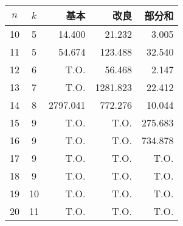  \centering 
 \begin{tabular}{c|c|r|r|r} %
  $n$ & $k$ & 基本 & 改良 & 部分和 \\ \hline
  10 & 5 & 14.400 & 21.232 & \alert{3.005} \\
  11 & 5 & 54.674 & 123.488 & \alert{32.540} \\
  12 & 6 & T.O. & 56.468 & \alert{2.147} \\
  13 & 7 & T.O. & 1281.823 & \alert{22.412} \\  
  14 & 8 & 2797.041 & 772.276 & \alert{10.044} \\   
  15 & 9 & T.O. & T.O. & \alert{275.683} \\  
  16 & 9 & T.O. & T.O. & \alert{734.878} \\
  17 & 9 & T.O. & T.O. & T.O. \\
  18 & 9 & T.O. & T.O. & T.O. \\
  19 & 10 & T.O. & T.O. & T.O. \\
  20 & 11 & T.O. & T.O. & T.O. \\ %
 \end{tabular}